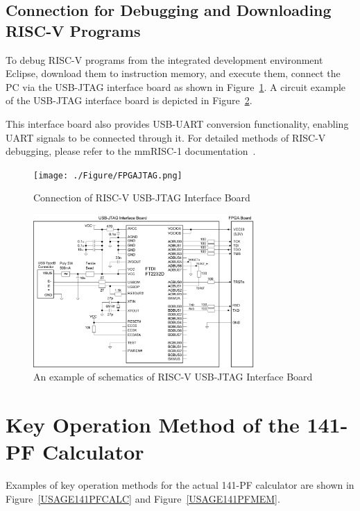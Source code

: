 \subsection{Connection for Debugging and Downloading RISC-V Programs}
To debug RISC-V programs from the integrated development environment Eclipse, download them to instruction memory, and execute them, connect the PC via the USB-JTAG interface board as shown in Figure~\ref{fig:FPGAJTAG}. A circuit example of the USB-JTAG interface board is depicted in Figure~\ref{fig:USBJTAG}. 

This interface board also provides USB-UART conversion functionality, enabling UART signals to be connected through it. For detailed methods of RISC-V debugging, please refer to the mmRISC-1 documentation~\cite{mmRISC-1}.

\begin{figure}[htbp]
  \texttt{[image: ./Figure/FPGAJTAG.png]}
  \caption{Connection of RISC-V USB-JTAG Interface Board}
  \label{fig:FPGAJTAG}
\end{figure}
\begin{figure}[htbp]
  \includegraphics[width=0.75\textwidth]{./Figure/USBJTAG.png}
  \caption{An example of schematics of RISC-V USB-JTAG Interface Board}
  \label{fig:USBJTAG}
\end{figure}

\section{Key Operation Method of the 141-PF Calculator}
Examples of key operation methods for the actual 141-PF calculator are shown in Figure~\ref{USAGE141PFCALC} and Figure~\ref{USAGE141PFMEM}.

